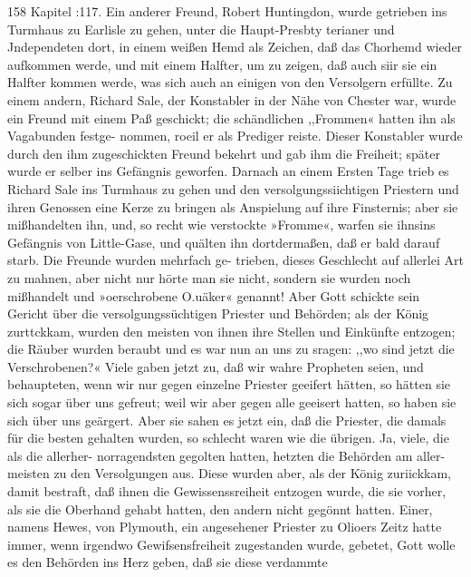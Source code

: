 158 Kapitel :117.
Ein anderer Freund, Robert Huntingdon, wurde getrieben
ins Turmhaus zu Earlisle zu gehen, unter die Haupt-Presbty
terianer und Jndependeten dort, in einem weißen Hemd als
Zeichen, daß das Chorhemd wieder aufkommen werde, und mit
einem Halfter, um zu zeigen, daß auch siir sie ein Halfter kommen
werde, was sich auch an einigen von den Versolgern erfüllte.
Zu einem andern, Richard Sale, der Konstabler in der Nähe
von Chester war, wurde ein Freund mit einem Paß geschickt;
die schändlichen ,,Frommen« hatten ihn als Vagabunden festge-
nommen, roeil er als Prediger reiste. Dieser Konstabler wurde
durch den ihm zugeschickten Freund bekehrt und gab ihm die
Freiheit; später wurde er selber ins Gefängnis geworfen. Darnach
an einem Ersten Tage trieb es Richard Sale ins Turmhaus zu
gehen und den versolgungssiichtigen Priestern und ihren Genossen
eine Kerze zu bringen als Anspielung auf ihre Finsternis; aber
sie mißhandelten ihn, und, so recht wie verstockte »Fromme«, warfen
sie ihnsins Gefängnis von Little-Gase, und quälten ihn dortdermaßen,
daß er bald darauf starb. Die Freunde wurden mehrfach ge-
trieben, dieses Geschlecht auf allerlei Art zu mahnen, aber nicht
nur hörte man sie nicht, sondern sie wurden noch mißhandelt und
»oerschrobene O.uäker« genannt! Aber Gott schickte sein Gericht
über die versolgungssüchtigen Priester und Behörden; als der
König zurttckkam, wurden den meisten von ihnen ihre Stellen und
Einkünfte entzogen; die Räuber wurden beraubt und es war nun
an uns zu sragen: ,,wo sind jetzt die Verschrobenen?« Viele gaben
jetzt zu, daß wir wahre Propheten seien, und behaupteten, wenn
wir nur gegen einzelne Priester geeifert hätten, so hätten sie sich
sogar über uns gefreut; weil wir aber gegen alle geeisert hatten,
so haben sie sich über uns geärgert. Aber sie sahen es jetzt ein,
daß die Priester, die damals für die besten gehalten wurden, so
schlecht waren wie die übrigen. Ja, viele, die als die allerher-
norragendsten gegolten hatten, hetzten die Behörden am aller-
meisten zu den Versolgungen aus. Diese wurden aber, als der
König zuriickkam, damit bestraft, daß ihnen die Gewissenssreiheit
entzogen wurde, die sie vorher, als sie die Oberhand gehabt hatten,
den andern nicht gegönnt hatten. Einer, namens Hewes, von
Plymouth, ein angesehener Priester zu Olioers Zeitz hatte immer,
wenn irgendwo Gewifsensfreiheit zugestanden wurde, gebetet, Gott
wolle es den Behörden ins Herz geben, daß sie diese verdammte


